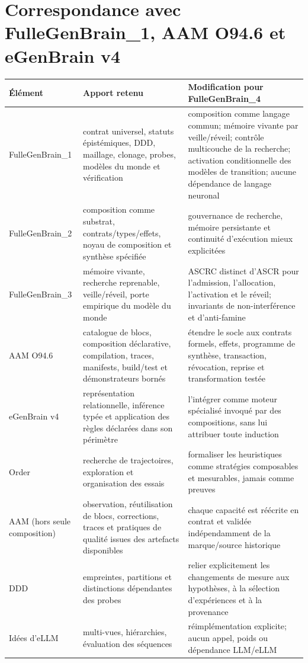 \documentclass[11pt,a4paper]{article}
\begin{document}
\section{Correspondance avec FulleGenBrain\_1, AAM O94.6 et eGenBrain v4}
\begin{longtable}{p{}p{}p{}}
\toprule Élément & Apport retenu & Modification pour FulleGenBrain\_4 \\
\midrule
FulleGenBrain\_1 & contrat universel, statuts épistémiques, DDD, maillage, clonage, probes, modèles du monde et vérification & composition comme langage commun; mémoire vivante par veille/réveil; contrôle multicouche de la recherche; activation conditionnelle des modèles de transition; aucune dépendance de langage neuronal \\
FulleGenBrain\_2 & composition comme substrat, contrats/types/effets, noyau de composition et synthèse spécifiée & gouvernance de recherche, mémoire persistante et continuité d'exécution mieux explicitées \\
FulleGenBrain\_3 & mémoire vivante, recherche reprenable, veille/réveil, porte empirique du modèle du monde & ASCRC distinct d’ASCR pour l’admission, l’allocation, l’activation et le réveil; invariants de non-interférence et d’anti-famine \\
AAM O94.6 & catalogue de blocs, composition déclarative, compilation, traces, manifests, build/test et démonstrateurs bornés & étendre le socle aux contrats formels, effets, programme de synthèse, transaction, révocation, reprise et transformation testée \\
eGenBrain v4 & représentation relationnelle, inférence typée et application des règles déclarées dans son périmètre & l'intégrer comme moteur spécialisé invoqué par des compositions, sans lui attribuer toute induction \\
Order & recherche de trajectoires, exploration et organisation des essais & formaliser les heuristiques comme stratégies composables et mesurables, jamais comme preuves \\
AAM (hors seule composition) & observation, réutilisation de blocs, corrections, traces et pratiques de qualité issues des artefacts disponibles & chaque capacité est réécrite en contrat et validée indépendamment de la marque/source historique \\
DDD & empreintes, partitions et distinctions dépendantes des probes & relier explicitement les changements de mesure aux hypothèses, à la sélection d'expériences et à la provenance \\
Idées d’eLLM & multi-vues, hiérarchies, évaluation des séquences & réimplémentation explicite; aucun appel, poids ou dépendance LLM/eLLM \\
\bottomrule
\end{longtable}
\end{document}
